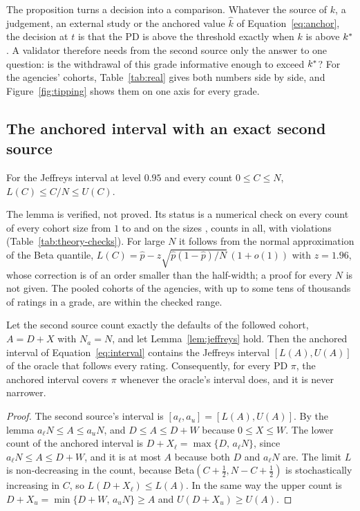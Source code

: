 The proposition turns a decision into a comparison. Whatever the source of $k$, a judgement, an external study or the anchored value $\widehat k$ of Equation~\eqref{eq:anchor}, the decision at $t$ is that the PD is above the threshold exactly when $k$ is above $k^{*}$. A validator therefore needs from the second source only the answer to one question: is the withdrawal of this grade informative enough to exceed $k^{*}$? For the agencies' cohorts, Table~\ref{tab:real} gives both numbers side by side, and Figure~\ref{fig:tipping} shows them on one axis for every grade.

\subsection{The anchored interval with an exact second source}

\begin{lemma}
\label{lem:jeffreys}
For the Jeffreys interval at level $0.95$ and every count $0\le C\le N$, $L(C)\le C/N\le U(C)$.
\end{lemma}
The lemma is verified, not proved. Its status is a numerical check on every count of every cohort size from $1$ to  and on the sizes ,  counts in all, with  violations (Table~\ref{tab:theory-checks}). For large $N$ it follows from the normal approximation of the Beta quantile, $L(C)=\widehat p-z\sqrt{\widehat p(1-\widehat p)/N}\,(1+o(1))$ with $z=1.96$, whose correction is of an order smaller than the half-width; a proof for every $N$ is not given. The pooled cohorts of the agencies, with up to some tens of thousands of ratings in a grade, are within the checked range.

\begin{proposition}
\label{prop:containment}
Let the second source count exactly the defaults of the followed cohort, $A=D+X$ with $N_a=N$, and let Lemma~\ref{lem:jeffreys} hold. Then the anchored interval of Equation~\eqref{eq:interval} contains the Jeffreys interval $[L(A),U(A)]$ of the oracle that follows every \wdn{} rating. Consequently, for every PD $\pi$, the anchored interval covers $\pi$ whenever the oracle's interval does, and it is never narrower.
\end{proposition}
\begin{proof}
The second source's interval is $[a_{\ell},a_{u}]=[L(A),U(A)]$. By the lemma $a_{\ell}N\le A\le a_{u}N$, and $D\le A\le D+W$ because $0\le X\le W$. The lower count of the anchored interval is $D+X_{\ell}=\max\{D,\,a_{\ell}N\}$, since $a_{\ell}N\le A\le D+W$, and it is at most $A$ because both $D$ and $a_{\ell}N$ are. The limit $L$ is non-decreasing in the count, because Beta$(C+\tfrac12,N-C+\tfrac12)$ is stochastically increasing in $C$, so $L(D+X_{\ell})\le L(A)$. In the same way the upper count is $D+X_{u}=\min\{D+W,\,a_{u}N\}\ge A$ and $U(D+X_{u})\ge U(A)$.
\end{proof}


